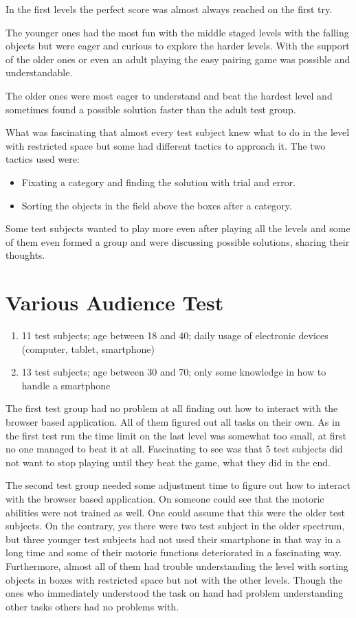 In the first levels the perfect score was almost always reached on the first try.

The younger ones had the most fun with the middle staged levels with the falling objects but were eager and curious
to explore the harder levels. With the support of the older ones or even an adult playing the easy pairing game
was possible and understandable.

The older ones were most eager to understand and beat the hardest level and sometimes found a possible solution
faster than the adult test group.

What was fascinating that almost every test subject knew what to do in the level with restricted space but
some had different tactics to approach it. The two tactics used were:
\begin{itemize}
    \item Fixating a category and finding the solution with trial and error.
    \item Sorting the objects in the field above the boxes after a category.
\end{itemize}

Some test subjects wanted to play more even after playing all the levels and some of them even formed a group and
were discussing possible solutions, sharing their thoughts.

\section{Various Audience Test}\label{sec:various-audience-test}
\begin{enumerate}
    \item 11 test subjects; age between 18 and 40; daily usage of electronic devices (computer, tablet, smartphone)
    \item 13 test subjects; age between 30 and 70; only some knowledge in how to handle a smartphone
\end{enumerate}

The first test group had no problem at all finding out how to interact with the browser based application.
All of them figured out all tasks on their own. As in the first test run the time limit on the last level was somewhat
too small, at first no one managed to beat it at all. Fascinating to see was that 5 test subjects did not want to stop
playing until they beat the game, what they did in the end.

The second test group needed some adjustment time to figure out how to interact with the browser based application.
On someone could see that the motoric abilities were not trained as well. One could assume that this were the older
test subjects. On the contrary, yes there were two test subject in the older spectrum, but three younger test subjects
had not used their smartphone in that way in a long time and some of their motoric functions deteriorated
in a fascinating way.
Furthermore, almost all of them had trouble understanding the level with sorting objects in boxes with restricted space
but not with the other levels.
Though the ones who immediately understood the task on hand had problem understanding other tasks others had no problems with.

